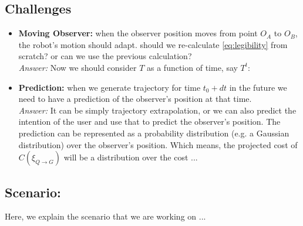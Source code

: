 \subsection{Challenges}

\begin{itemize}
    \item \textbf{Moving Observer:} when the observer position moves from point $O_A$ to $O_B$, the robot's motion should adapt.
    should we re-calculate \ref{eq:legibility} from scratch? or can we use the previous calculation?\\
    \textit{Answer:} Now we should consider $T$ as a function of time, say $T^t$:

    \item \textbf{Prediction:} when we generate trajectory for time $t_0+dt$ in the future we need to have a prediction of the observer's position at that time.\\
    \textit{Answer:} It can be simply trajectory extrapolation, or we can also predict the intention of the user and use that to predict the observer's position.
    The prediction can be represented as a probability distribution (e.g. a Gaussian distribution) over the observer's position.
    Which means, the projected cost of $C(\xi_{Q \rightarrow G})$ will be a distribution over the cost ...
\end{itemize}

\subsection{Scenario:}
Here, we explain the scenario that we are working on ...

